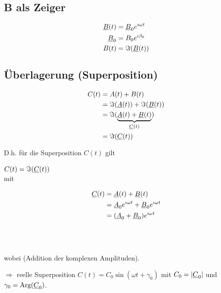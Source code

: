 \subsection{B als Zeiger}
\vspace{-1.2cm}
\begin{minipage}{4cm}
	\begin{align*}
	\underline{B}(t) &= \underline{B}_0e^{\imath\omega t}\\
	\underline{B}_0 &= B_0e^{\imath\beta_0}\\
	B(t) &= \Im(\underline{B}(t))
	\end{align*}
\end{minipage}

\clearpage
\subsection{Überlagerung (Superposition)}
\vspace{-1.2cm}
\begin{minipage}{5.8cm}
	\begin{align*}
	C(t) &= A(t)+B(t)\\
	&= \Im(\underline{A}(t))+\Im(\underline{B}(t))\\
	&=\Im(\underbrace{\underline{A}(t)+\underline{B}(t)}_{\underline{C}(t)})\\
	&=\Im(\underline{C}(t))
	\end{align*}
\end{minipage}

\vspace{1cm}
D.h. für die Superposition $C(t)$ gilt\\
\parbox{20pt}{\quad}$C(t) = \Im(\underline{C}(t))$\\
mit\vspace{-1.5em}\\
\begin{minipage}{5.5cm}
	\begin{align*}
	\underline{C}(t) &= \underline{A}(t)+\underline{B}(t)\\
	&= \underline{A}_0e^{\imath\omega t}+\underline{B}_0e^{\imath\omega t}\\
	&= (\underline{A}_0+\underline{B}_0)e^{\imath\omega t}
	\end{align*}
\end{minipage}\\
\parbox{17pt}{\quad}\\
wobei  (Addition der komplexen Amplituden).

$\Rightarrow$ reelle Superposition $C(t) = C_0\sin(\omega t+\gamma_0)$ mit $C_0 = |\underline{C}_0|$ und $\gamma_0 = \mathbin\text{Arg}(\underline{C}_0)$.

